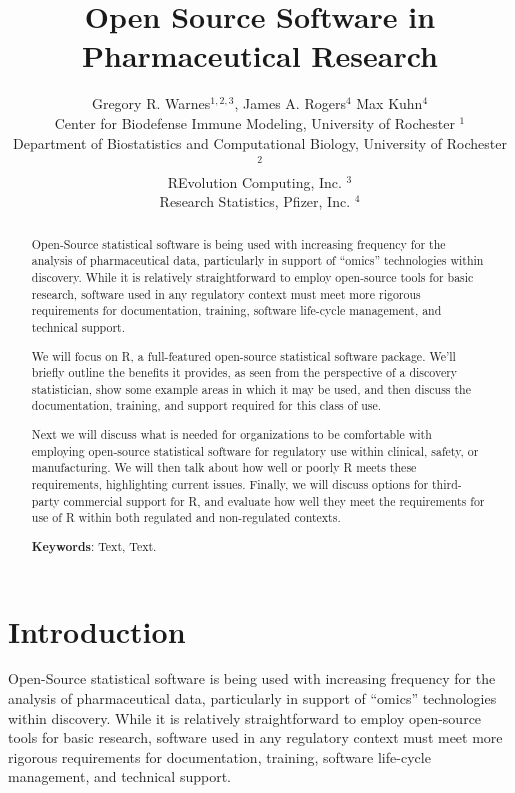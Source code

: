\documentclass{asaproc}
\title{Open Source Software in Pharmaceutical Research}
\author{
  Gregory R. Warnes$^{1,2,3}$, James A. Rogers$^4$ Max Kuhn$^4$ 
\\
  Center for Biodefense Immune Modeling, University of Rochester $^1$ \\
  Department of Biostatistics and Computational Biology, 
  University of Rochester $^2$ \\
  REvolution Computing, Inc. $^3$ \\
  Research Statistics, Pfizer, Inc. $^4$
}
\begin{document}
\maketitle

\begin{abstract}
  
Open-Source statistical software is being used with increasing
frequency for the analysis of pharmaceutical data, particularly in
support of ``omics'' technologies within discovery. While it is
relatively straightforward to employ open-source tools for basic
research, software used in any regulatory context must
meet more rigorous requirements for documentation, training,
software life-cycle management, and technical support.

\vspace{1em}

We will focus on \textsc{R}, a full-featured open-source statistical
software package. We'll briefly outline the benefits it provides, as
seen from the perspective of a discovery statistician, show some
example areas in which it may be used, and then discuss the
documentation, training, and support required for this class of use.

\vspace{1em}

Next we will discuss what is needed for organizations to be
comfortable with employing open-source statistical software for
regulatory use within clinical, safety, or manufacturing. We will
then talk about how well or poorly \textsc{R} meets these requirements,
highlighting current issues.  Finally, we will discuss options for
third-party commercial support for \textsc{R}, and evaluate how well they
meet the requirements for use of \textsc{R} within both regulated and
non-regulated contexts.

\vskip6pt


{{\bf \noindent Keywords}: Text, Text.}


\end{abstract}

\section{Introduction}

  Open-Source statistical software is being used with increasing
  frequency for the analysis of pharmaceutical data, particularly in
  support of ``omics'' technologies within discovery. While it is
  relatively straightforward to employ open-source tools for basic
  research, software used in any regulatory context must meet more
  rigorous requirements for documentation, training, software
  life-cycle management, and technical support.
\end{document}
